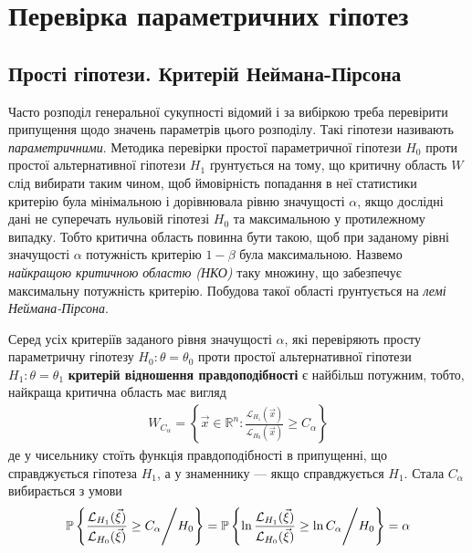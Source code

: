 \section{Перевірка параметричних гіпотез}
\subsection{Прості гіпотези. Критерій Неймана-Пірсона}

Часто розподіл генеральної сукупності відомий і за вибіркою треба перевірити 
припущення щодо значень параметрів цього розподілу. Такі гіпотези називають 
\emph{параметричними}. Методика перевірки простої параметричної гіпотези $H_0$
проти простої альтернативної гіпотези $H_1$ ґрунтується на тому, що критичну область $W$
слід вибирати таким чином, щоб ймовірність попадання в неї статистики критерію була мінімальною і 
дорівнювала рівню значущості $\alpha$, якщо дослідні дані не суперечать нульовій гіпотезі $H_0$ та 
максимальною у протилежному випадку. 
Тобто критична область повинна бути такою, щоб при заданому рівні значущості $\alpha$ потужність критерію
$1-\beta$ була максимальною. Назвемо \emph{найкращою критичною областю (НКО)} таку множину, що забезпечує максимальну 
потужність критерію. Побудова такої області ґрунтується на \emph{лемі Неймана-Пірсона}.
\begin{theorem*}
    Серед усіх критеріїв заданого рівня значущості $\alpha$, які 
    перевіряють просту параметричну гіпотезу $H_0 : \theta = \theta_0$ проти простої альтернативної гіпотези 
    $H_1: \theta = \theta_1$ \textbf{критерій відношення правдоподібності} є найбільш потужним, тобто, найкраща критична область
    має вигляд
    \begin{gather}
        W_{C_\alpha} = \left\{
            \vec{x} \in \mathbb{R}^n : \frac{\mathcal{L}_{H_1}(\vec{x})}{\mathcal{L}_{H_0}(\vec{x})} \geq C_{\alpha}
         \right\}
    \end{gather}
    де у чисельнику стоїть функція правдоподібності в припущенні, що справджується 
    гіпотеза $H_1$, а у знаменнику --- якщо справджується $H_1$. Стала $C_{\alpha}$ вибирається з умови
    \begin{gather}
        \P \left\{ \frac{\mathcal{L}_{H_1}(\vec{\xi})}{\mathcal{L}_{H_0}(\vec{\xi})} \geq C_{\alpha} \middle/ H_0\right\} = 
        \P \left\{ \ln\frac{\mathcal{L}_{H_1}(\vec{\xi})}{\mathcal{L}_{H_0}(\vec{\xi})} \geq \ln C_{\alpha} \middle/ H_0\right\} = \alpha
    \end{gather}
\end{theorem*}
